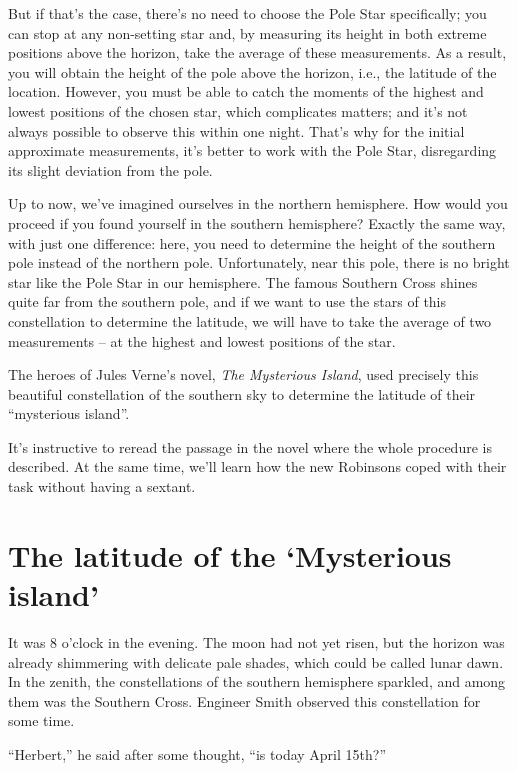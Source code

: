 But if that's the case, there's no need to choose the Pole Star specifically; you can stop at any non-setting star and, by measuring its height in both extreme positions above the horizon, take the average of these measurements. As a result, you will obtain the height of the pole above the horizon, i.e., the latitude of the location. However, you must be able to catch the moments of the highest and lowest positions of the chosen star, which complicates matters; and it's not always possible to observe this within one night. That's why for the initial approximate measurements, it's better to work with the Pole Star, disregarding its slight deviation from the pole.

Up to now, we've imagined ourselves in the northern hemisphere. How would you proceed if you found yourself in the southern hemisphere? Exactly the same way, with just one difference: here, you need to determine the height of the southern pole instead of the northern pole. Unfortunately, near this pole, there is no bright star like the Pole Star in our hemisphere. The famous Southern Cross shines quite far from the southern pole, and if we want to use the stars of this constellation to determine the latitude, we will have to take the average of two measurements -- at the highest and lowest positions of the star.

The heroes of Jules Verne's novel, \emph{The Mysterious Island}, used precisely this beautiful constellation of the southern sky to determine the latitude of their ``mysterious island''.

It's instructive to reread the passage in the novel where the whole procedure is described. At the same time, we'll learn how the new Robinsons coped with their task without having a sextant.



\section{The latitude of the `Mysterious island'}

It was 8 o'clock in the evening. The moon had not yet risen, but the horizon was already shimmering with delicate pale shades, which could be called lunar dawn. In the zenith, the constellations of the southern hemisphere sparkled, and among them was the Southern Cross. Engineer Smith observed this constellation for some time.

``Herbert,'' he said after some thought, ``is today April 15th?''

